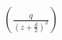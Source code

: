 \documentclass[preview]{standalone}
\begin{document}
\begin{align*}
\left ( {\frac{q}{\left ( z+\frac{d}{2} \right )^{2}} }\right )
\end{align*}
\end{document}
